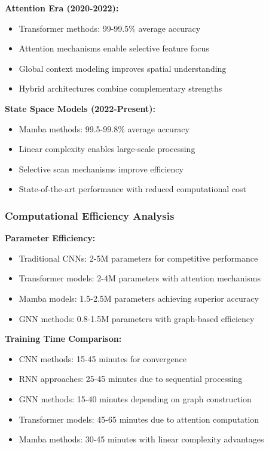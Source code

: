 \documentclass[journal]{IEEEtran}
\begin{document}
\textbf{Attention Era (2020-2022):}
\begin{itemize}
\item Transformer methods: 99-99.5\% average accuracy
\item Attention mechanisms enable selective feature focus
\item Global context modeling improves spatial understanding
\item Hybrid architectures combine complementary strengths
\end{itemize}

\textbf{State Space Models (2022-Present):}
\begin{itemize}
\item Mamba methods: 99.5-99.8\% average accuracy
\item Linear complexity enables large-scale processing
\item Selective scan mechanisms improve efficiency
\item State-of-the-art performance with reduced computational cost
\end{itemize}

\subsubsection{Computational Efficiency Analysis}

\textbf{Parameter Efficiency:}
\begin{itemize}
\item Traditional CNNs: 2-5M parameters for competitive performance
\item Transformer models: 2-4M parameters with attention mechanisms
\item Mamba models: 1.5-2.5M parameters achieving superior accuracy
\item GNN methods: 0.8-1.5M parameters with graph-based efficiency
\end{itemize}

\textbf{Training Time Comparison:}
\begin{itemize}
\item CNN methods: 15-45 minutes for convergence
\item RNN approaches: 25-45 minutes due to sequential processing
\item GNN methods: 15-40 minutes depending on graph construction
\item Transformer models: 45-65 minutes due to attention computation
\item Mamba methods: 30-45 minutes with linear complexity advantages
\end{itemize}
\end{document}
